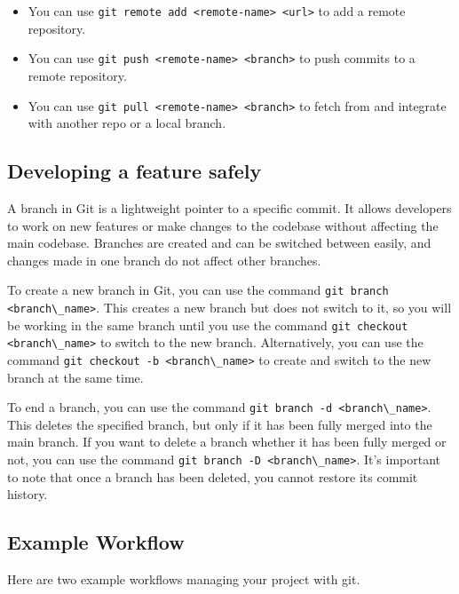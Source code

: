 \documentclass[
  notoc %
]{tufte-book}
\providecommand{\tightlist}{%
  \setlength{\itemsep}{0pt}\setlength{\parskip}{0pt}
}
\newcommand{\passthrough}[1]{#1}
\begin{document}
\begin{itemize}
\tightlist
\item
  You can use
  \passthrough{\lstinline!git remote add <remote-name> <url>!} to add a
  remote repository.
\item
  You can use \passthrough{\lstinline!git push <remote-name> <branch>!}
  to push commits to a remote repository.
\item
  You can use \passthrough{\lstinline!git pull <remote-name> <branch>!}
  to fetch from and integrate with another repo or a local branch.
\end{itemize}

\hypertarget{developing-a-feature-safely}{%
\subsection{Developing a feature
safely}\label{developing-a-feature-safely}}

A branch in Git is a lightweight pointer to a specific commit. It allows
developers to work on new features or make changes to the codebase
without affecting the main codebase. Branches are created and can be
switched between easily, and changes made in one branch do not affect
other branches.

To create a new branch in Git, you can use the command
\passthrough{\lstinline!git branch <branch\_name>!}. This creates a new
branch but does not switch to it, so you will be working in the same
branch until you use the command
\passthrough{\lstinline!git checkout <branch\_name>!} to switch to the
new branch. Alternatively, you can use the command
\passthrough{\lstinline!git checkout -b <branch\_name>!} to create and
switch to the new branch at the same time.

To end a branch, you can use the command
\passthrough{\lstinline!git branch -d <branch\_name>!}. This deletes the
specified branch, but only if it has been fully merged into the main
branch. If you want to delete a branch whether it has been fully merged
or not, you can use the command
\passthrough{\lstinline!git branch -D <branch\_name>!}. It's important
to note that once a branch has been deleted, you cannot restore its
commit history.

\hypertarget{example-workflow}{%
\subsection{Example Workflow}\label{example-workflow}}

Here are two example workflows managing your project with git.
\end{document}
